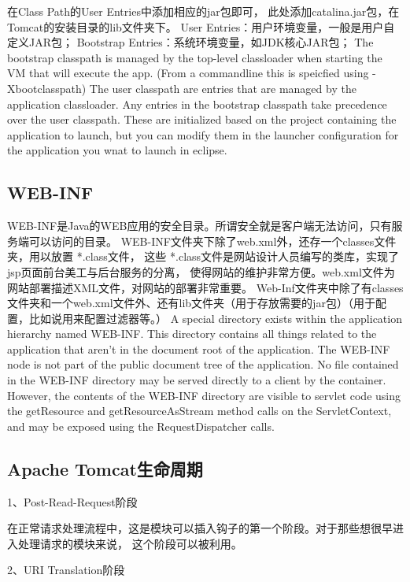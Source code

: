 \documentclass{book}
\begin{document}
在Class Path的User Entries中添加相应的jar包即可，
此处添加catalina.jar包，在Tomcat的安装目录的lib文件夹下。
User Entries：用户环境变量，一般是用户自定义JAR包；
Bootstrap Entries：系统环境变量，如JDK核心JAR包；
The bootstrap classpath is managed by the top-level 
classloader when starting the VM that will execute the app. 
(From a commandline this is speicfied using -Xbootclasspath)
The user classpath are entries that are managed by the application classloader.
Any entries in the bootstrap classpath take precedence over the user classpath.
These are initialized based on the project containing the application to launch, 
but you can modify them in the launcher configuration for the application you wnat to launch in eclipse.

\subsection{WEB-INF}

WEB-INF是Java的WEB应用的安全目录。所谓安全就是客户端无法访问，只有服务端可以访问的目录。
WEB-INF文件夹下除了web.xml外，还存一个classes文件夹，用以放置 *.class文件，
这些 *.class文件是网站设计人员编写的类库，实现了jsp页面前台美工与后台服务的分离，
使得网站的维护非常方便。web.xml文件为网站部署描述XML文件，对网站的部署非常重要。
Web-Inf文件夹中除了有classes文件夹和一个web.xml文件外、还有lib文件夹（用于存放需要的jar包）（用于配置，比如说用来配置过滤器等。）
A special directory exists within the application hierarchy named  WEB-INF. 
This directory contains all things related to the application that aren’t 
in the document root of the application. The  WEB-INF node is not part of 
the public document tree of the application. 
No file contained in the WEB-INF directory may be served directly to a client by the container. 
However, the contents of the WEB-INF directory are visible to servlet code using the getResource 
and getResourceAsStream method calls on the ServletContext, and may be exposed using 
the RequestDispatcher calls.

\subsection{Apache Tomcat生命周期}

1、Post-Read-Request阶段

在正常请求处理流程中，这是模块可以插入钩子的第一个阶段。对于那些想很早进入处理请求的模块来说，
这个阶段可以被利用。

2、URI Translation阶段 
\end{document}
